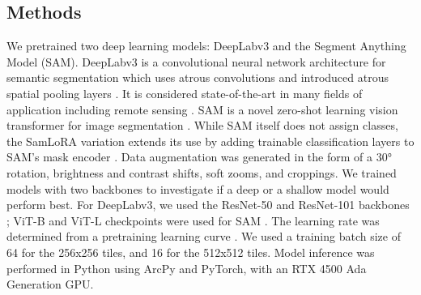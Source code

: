 \documentclass[lettersize,journal]{IEEEtran}
\begin{document}
\subsection{Methods}
We pretrained two deep learning models: DeepLabv3 and the Segment Anything Model (SAM). DeepLabv3 is a convolutional neural network architecture for semantic segmentation which uses atrous convolutions 
and introduced atrous spatial pooling layers \cite{chenDeepLabSemanticImage2018}. It is considered state-of-the-art in many fields of application including remote sensing \cite{tuiaDeepLearningbasedSemantic2021}. 
SAM is a novel zero-shot learning vision transformer for image segmentation \cite{kirillovSegmentAnything2023}. While SAM itself does not assign classes, the SamLoRA variation extends its use by adding trainable 
classification layers to SAM's mask encoder \cite{esriFinetuneSegmentAnything2025}. Data augmentation was generated in the form of a 30° rotation, brightness and contrast shifts, soft zooms, and croppings. 
We trained models with two backbones to investigate if a deep or a shallow model would perform best. For DeepLabv3, we used the ResNet-50 and ResNet-101 backbones \cite{heDeepResidualLearning2015}; 
ViT-B and ViT-L checkpoints were used for SAM \cite{kirillovSegmentAnything2023}. The learning rate was determined from a pretraining learning curve \cite{smithCyclicalLearningRates2017,howardFastaiLayeredAPI2020}. 
We used a training batch size of 64 for the 256x256 tiles, and 16 for the 512x512 tiles. Model inference was performed in Python using ArcPy and PyTorch, with an RTX 4500 Ada Generation GPU.
\end{document}

